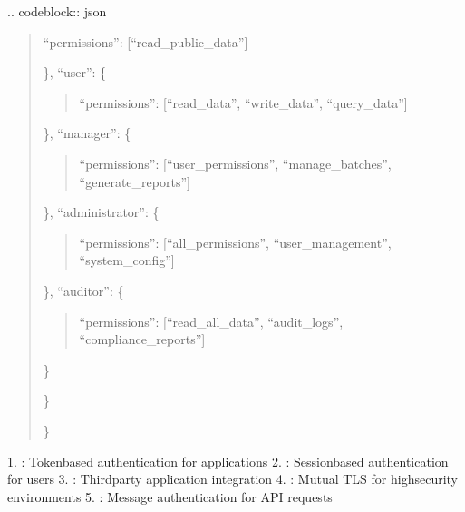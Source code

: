 \documentclass[letterpaper,10pt,english]{sphinxmanual}
\begin{document}
\sphinxAtStartPar
{}
.. code\sphinxhyphen{}block:: json
\begin{quote}
\begin{description}
\sphinxlineitem{\{}\begin{description}
\begin{description}
\sphinxAtStartPar
“permissions”: {[}“read\_public\_data”{]}

\end{description}

\sphinxAtStartPar
\},
“user”: \{
\begin{quote}

\sphinxAtStartPar
“permissions”: {[}“read\_data”, “write\_data”, “query\_data”{]}
\end{quote}

\sphinxAtStartPar
\},
“manager”: \{
\begin{quote}

\sphinxAtStartPar
“permissions”: {[}“user\_permissions”, “manage\_batches”, “generate\_reports”{]}
\end{quote}

\sphinxAtStartPar
\},
“administrator”: \{
\begin{quote}

\sphinxAtStartPar
“permissions”: {[}“all\_permissions”, “user\_management”, “system\_config”{]}
\end{quote}

\sphinxAtStartPar
\},
“auditor”: \{
\begin{quote}

\sphinxAtStartPar
“permissions”: {[}“read\_all\_data”, “audit\_logs”, “compliance\_reports”{]}
\end{quote}

\sphinxAtStartPar
\}

\end{description}

\sphinxAtStartPar
\}

\end{description}

\sphinxAtStartPar
\}
\end{quote}

\sphinxAtStartPar
{}
1. : Token\sphinxhyphen{}based authentication for applications
2. : Session\sphinxhyphen{}based authentication for users
3. : Third\sphinxhyphen{}party application integration
4. : Mutual TLS for high\sphinxhyphen{}security environments
5. : Message authentication for API requests
\end{document}
